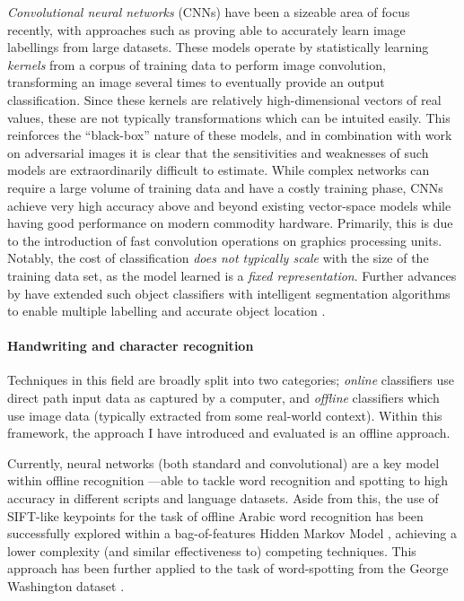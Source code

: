 \documentclass{mpaper}
\begin{document}
\emph{Convolutional neural networks} (CNNs) have been a sizeable area of focus recently, with approaches such as \citeauthor{ConvNet} \cite{ConvNet} proving able to accurately learn image labellings from large datasets.
These models operate by statistically learning \emph{kernels} from a corpus of training data to perform image convolution, transforming an image several times to eventually provide an output classification.
Since these kernels are relatively high-dimensional vectors of real values, these are not typically transformations which can be intuited easily.
This reinforces the ``black-box'' nature of these models, and in combination with work on adversarial images \cite{AdversarialML} it is clear that the sensitivities and weaknesses of such models are extraordinarily difficult to estimate.
While complex networks can require a large volume of training data and have a costly training phase, CNNs achieve very high accuracy above and beyond existing vector-space models while having good performance on modern commodity hardware.
Primarily, this is due to the introduction of fast convolution operations on graphics processing units.
Notably, the cost of classification \emph{does not typically scale} with the size of the training data set, as the model learned is a \emph{fixed representation}.
Further advances by \citeauthor{MultilabelCNN} have extended such object classifiers with intelligent segmentation algorithms \cite{BING} to enable multiple labelling and accurate object location \cite{MultilabelCNN}.


\paragraph{Handwriting and character recognition}
Techniques in this field are broadly split into two categories; \emph{online} classifiers use direct path input data as captured by a computer, and \emph{offline} classifiers which use image data (typically extracted from some real-world context).
Within this framework, the approach I have introduced and evaluated is an offline approach.

Currently, neural networks (both standard and convolutional) are a key model within offline recognition \cite{Handwriting-CNN-1,Handwriting-CNN-2}---able to tackle word recognition and spotting to high accuracy in different scripts and language datasets.
Aside from this, the use of SIFT-like keypoints for the task of offline Arabic word recognition has been successfully explored within a bag-of-features Hidden Markov Model \cite{Arabic-SIFT}, achieving a lower complexity (and similar effectiveness to) competing techniques.
This approach has been further applied to the task of word-spotting from the George Washington dataset \cite{Arabic-SIFT-Better}.
\end{document}
